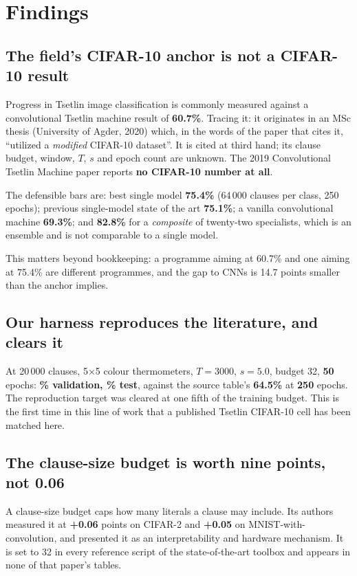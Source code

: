 \section{Findings}

\subsection{The field's CIFAR-10 anchor is not a CIFAR-10 result}
Progress in Tsetlin image classification is commonly measured against a convolutional Tsetlin machine
result of \textbf{60.7\%}. Tracing it: it originates in an MSc thesis (University of Agder, 2020)
which, in the words of the paper that cites it, ``utilized a \emph{modified} CIFAR-10 dataset''. It
is cited at third hand; its clause budget, window, $T$, $s$ and epoch count are unknown. The 2019
Convolutional Tsetlin Machine paper reports \textbf{no CIFAR-10 number at all}.

The defensible bars are: best single model \textbf{75.4\%} (64\,000 clauses per class, 250 epochs);
previous single-model state of the art \textbf{75.1\%}; a vanilla convolutional machine
\textbf{69.3\%}; and \textbf{82.8\%} for a \emph{composite} of twenty-two specialists, which is an
ensemble and is not comparable to a single model.

This matters beyond bookkeeping: a programme aiming at 60.7\% and one aiming at 75.4\% are different
programmes, and the gap to CNNs is 14.7 points smaller than the anchor implies.

\subsection{Our harness reproduces the literature, and clears it}
At 20\,000 clauses, 5$\times$5 colour thermometers, $T=3000$, $s=5.0$, budget 32, \textbf{50} epochs:
\textbf{\PreflightVal\% validation, \PreflightTest\% test}, against the source table's
\textbf{64.5\%} at \textbf{250} epochs. The reproduction target was cleared at one fifth of the
training budget. This is the first time in this line of work that a published Tsetlin CIFAR-10 cell
has been matched here.

\subsection{The clause-size budget is worth nine points, not 0.06}
\label{sec:budget}
A clause-size budget caps how many literals a clause may include. Its authors measured it at
\textbf{+0.06} points on CIFAR-2 and \textbf{+0.05} on MNIST-with-convolution, and presented it as an
interpretability and hardware mechanism. It is set to 32 in every reference script of the
state-of-the-art toolbox and appears in none of that paper's tables.

